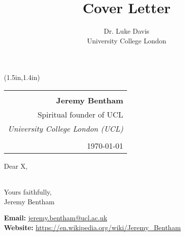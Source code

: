 \documentclass[11pt,a4paper]{article}
\title{Cover Letter}
\author{Dr. Luke Davis  \\
	University College London
	}
\begin{document}
\begin{textblock*}{6.375in}(1.5in,1.4in)   %
    \sffamily
    \hfill
\end{textblock*}
\hfill
\begin{tabular}[t]{@{} r @{}}
\vspace{5.7em} \\
  \bfseries Jeremy Bentham \\
   Spiritual founder of UCL \\
  \itshape University College London (UCL) \\
  \vspace{1em} \\
  \today
\end{tabular}

\bigskip

Dear X,

\bigskip

\lipsum[1-10]
\vspace{1em} \\
Yours faithfully,
\vspace{1em} \\
Jeremy Bentham


\vfill
{\footnotesize\color{black}\sffamily
\textbf{Email:} \url{jeremy.bentham@ucl.ac.uk} \\
\textbf{Website:} \url{https://en.wikipedia.org/wiki/Jeremy_Bentham}
}
\end{document}
